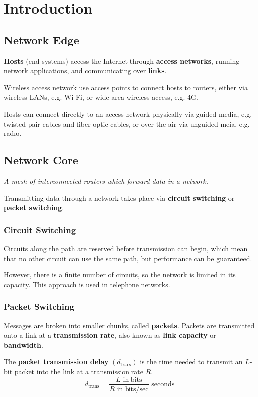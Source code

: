 \section{Introduction}

\subsection{Network Edge}
\textbf{Hosts} (end systems) access the Internet through \textbf{access networks}, running network applications,
and communicating over \textbf{links}.

Wireless access network use access points to connect hosts to routers, either via wireless LANs, e.g. Wi-Fi,
or wide-area wireless access, e.g. 4G.

Hosts can connect directly to an access network physically via guided media, e.g. twisted pair cables and fiber optic cables,
or over-the-air via unguided meia, e.g. radio.

\subsection{Network Core}
\emph{A mesh of interconnected routers which forward data in a network.}

Transmitting data through a network takes place via \textbf{circuit switching} or \textbf{packet switching}.

\subsubsection{Circuit Switching}
Circuits along the path are reserved before transmission can begin, which mean that
no other circuit can use the same path, but performance can be guaranteed.

However, there is a finite number of circuits, so the network is limited in its capacity.
This approach is used in telephone networks.

\subsubsection{Packet Switching}
Messages are broken into smaller chunks, called \textbf{packets}.
Packets are transmitted onto a link at a \textbf{transmission rate}, also known as \textbf{link capacity} or \textbf{bandwidth}.

The \textbf{packet transmission delay} $\left(d_{\text{trans}}\right)$ is the time needed to transmit an $L$-bit packet into the link 
at a transmission rate $R$.\\
\begin{equation*}
    d_{\text{trans}} = \frac{L \text{ in bits}}{R \text{ in bits/sec}} \text{ seconds}
\end{equation*}

